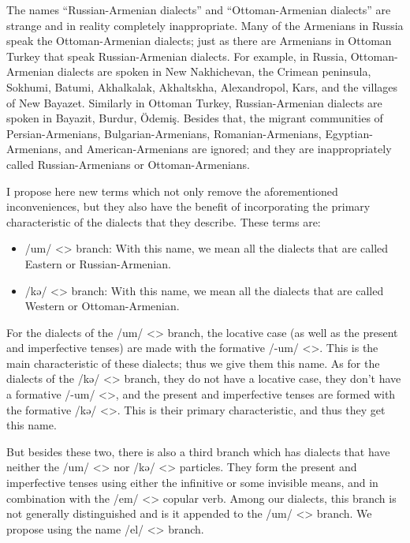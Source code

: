 The names ``Russian-Armenian dialects'' and ``Ottoman-Armenian dialects'' are strange and in reality completely inappropriate. Many of the Armenians in Russia speak the Ottoman-Armenian dialects; just as there are Armenians in Ottoman Turkey that speak Russian-Armenian dialects. For example, in Russia,   Ottoman-Armenian dialects are spoken in New Nakhichevan, the Crimean peninsula, Sokhumi, Batumi,    Akhalkalak, Akhaltskha, Alexandropol, Kars, and the villages of New Bayazet. Similarly in Ottoman Turkey, Russian-Armenian dialects are spoken in Bayazit, Burdur, Ödemiş. Besides that, the migrant communities of Persian-Armenians, Bulgarian-Armenians, Romanian-Armenians, Egyptian-Armenians, and American-Armenians are ignored; and they are inappropriately called Russian-Armenians or Ottoman-Armenians. 

I propose here new terms which not only remove the aforementioned inconveniences, but they also have the benefit of incorporating the primary characteristic of the dialects that they describe. These terms are:


\begin{adjarianpage}\label{page:35}\end{adjarianpage}%

\begin{itemize}
	\item /um/ <> branch: With this name, we mean all the dialects that are called Eastern or Russian-Armenian.
	\item /kə/ <> branch: With this name, we mean all the dialects that are called Western or Ottoman-Armenian.
	
\end{itemize}

For the dialects of the /um/ <> branch, the locative case   (as well as the present and imperfective tenses) are made with the formative /-um/ <>. This is the main characteristic of these dialects; thus we give them this name. As for the dialects of the /kə/ <> branch, they do not have a locative case, they don't have a formative /-um/ <>, and the present and imperfective tenses are formed with the formative /kə/ <>. This is their primary characteristic, and thus they get this name. 

But besides these two, there is also a third branch which has dialects that have neither the /um/ <> nor /kə/ <> particles. They form the present and imperfective tenses using either the infinitive or some invisible means, and in combination with the /em/ <> copular verb. Among our dialects, this branch is not generally distinguished and is it appended to the /um/ <> branch. We propose using the name /el/ <> branch. 

